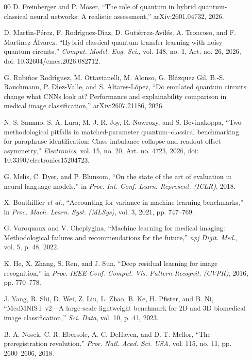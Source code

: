 \documentclass{ieeeaccess}
\begin{document}
\begin{thebibliography}{00}
 D. Freinberger and P. Moser, ``The role of quantum in hybrid quantum-classical neural networks: A realistic assessment,'' arXiv:2601.04732, 2026.

 D. Mart\'{\i}n-P\'erez, F. Rodr\'{\i}guez-D\'{\i}az, D. Guti\'errez-Avil\'es, A. Troncoso, and F. Mart\'{\i}nez-\'Alvarez, ``Hybrid classical-quantum transfer learning with noisy quantum circuits,'' \emph{Comput. Model. Eng. Sci.}, vol. 148, no. 1, Art. no. 26, 2026, doi: 10.32604/cmes.2026.082712.

 G. Rubi\~nos Rodr\'{\i}guez, M. Ottavianelli, M. Alonso, G. Bl\'azquez Gil, B.-S. Rauchmann, P. D\'{\i}ez-Valle, and S. Altares-L\'opez, ``Do emulated quantum circuits change what CNNs look at? Performance and explainability comparison in medical image classification,'' arXiv:2607.21186, 2026.

 N. S. Sammo, S. A. Lura, M. J. R. Joy, R. Nowrozy, and S. Bevinakoppa, ``Two methodological pitfalls in matched-parameter quantum--classical benchmarking for paraphrase identification: Class-imbalance collapse and readout-offset asymmetry,'' \emph{Electronics}, vol. 15, no. 20, Art. no. 4723, 2026, doi: 10.3390/electronics15204723.

 G. Melis, C. Dyer, and P. Blunsom, ``On the state of the art of evaluation in neural language models,'' in \emph{Proc. Int. Conf. Learn. Represent. (ICLR)}, 2018.

 X. Bouthillier \emph{et al.}, ``Accounting for variance in machine learning benchmarks,'' in \emph{Proc. Mach. Learn. Syst. (MLSys)}, vol. 3, 2021, pp. 747--769.

 G. Varoquaux and V. Cheplygina, ``Machine learning for medical imaging: Methodological failures and recommendations for the future,'' \emph{npj Digit. Med.}, vol. 5, p. 48, 2022.

 K. He, X. Zhang, S. Ren, and J. Sun, ``Deep residual learning for image recognition,'' in \emph{Proc. IEEE Conf. Comput. Vis. Pattern Recognit. (CVPR)}, 2016, pp. 770--778.

 J. Yang, R. Shi, D. Wei, Z. Liu, L. Zhao, B. Ke, H. Pfister, and B. Ni, ``MedMNIST v2---A large-scale lightweight benchmark for 2D and 3D biomedical image classification,'' \emph{Sci. Data}, vol. 10, p. 41, 2023.

 B. A. Nosek, C. R. Ebersole, A. C. DeHaven, and D. T. Mellor, ``The preregistration revolution,'' \emph{Proc. Natl. Acad. Sci. USA}, vol. 115, no. 11, pp. 2600--2606, 2018.


\end{thebibliography}
\end{document}
